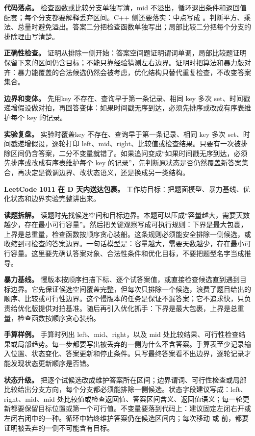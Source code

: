 \textbf{代码落点。} 检查函数或比较分支单独写清，mid 不溢出，循环退出条件和返回值配套；每个分支都要解释丢弃区间。C++ 侧还要落实：中点写成 。判断平方、乘法、总量时避免溢出。答案二分把检查函数单独写出；局部比较二分把每个分支的排除理由写清楚。

\textbf{正确性检查。} 证明从排除一侧开始：答案空间题证明谓词单调，局部比较题证明保留下来的区间仍含目标；不能只靠经验猜测左右边界。证明时把算法和暴力版对齐：暴力能覆盖的合法候选仍然会被考虑，优化结构只替代重复检查，不改变答案集合。

\textbf{边界和变体。} 先用key 不存在、查询早于第一条记录、相同 key 多次 set、时间戳递增假设做对拍，再回答变体：如果时间戳无序到达，必须先排序或改成有序表维护每个 key 的记录。

\textbf{实验复盘。} 实验时覆盖key 不存在、查询早于第一条记录、相同 key 多次 set、时间戳递增假设，逐轮打印 left、mid、right、比较值或检查结果。只要有一次被排除区间仍含答案，二分不变量就错了。如果追问变成“如果时间戳无序到达，必须先排序或改成有序表维护每个 key 的记录”，先判断原状态是否仍然覆盖新答案集合，再决定是微调边界、改状态语义，还是换成另一类结构。

\noindent\textbf{LeetCode 1011 在 D 天内送达包裹。} 工作坊目标：把题面模型、暴力基线、优化状态和边界实验完整讲出来。

\textbf{读题拆解。} 读题时先找候选空间和目标边界。本题可以压成“容量越大，需要天数越少，存在最小可行容量”。然后把关键观察写成可执行规则：下界是最大包裹，上界是总重量，检查函数按顺序贪心装船。这条规则必须能安全排除一侧候选，或收缩到可检查的答案边界。一句话模型是：容量越大，需要天数越少，存在最小可行容量。这里要先确认答案对象、合法性条件和优化目标，不要把题型名字当成推导。

\textbf{暴力基线。} 慢版本按顺序扫描下标、逐个试答案值，或直接检查候选直到遇到目标边界。它先保证候选空间覆盖完整，但每次只排除一个候选，浪费了题目给出的顺序、比较或可行性边界。这个慢版本的任务是保证不漏答案；它不追求快，只负责给优化版提供对拍基准。随后再引入优化抓手：下界是最大包裹，上界是总重量，检查函数按顺序贪心装船。

\textbf{手算样例。} 手算时列出 left、mid、right，以及 mid 处比较结果、可行性检查结果或局部趋势。每一步都要写出被丢弃的一侧为什么不含答案。手算表至少记录输入位置、状态变化、答案更新和停止条件。只写最终答案看不出边界，逐轮记录才能发现状态更新顺序是否错。

\textbf{状态升级。} 把逐个试候选改成维护答案所在区间；边界谓词、可行性检查或局部比较给出分支方向，每个分支都必须能排除一侧候选。状态字段建议写成：left、right、mid、mid 处比较值或检查返回值、答案区间含义、返回值语义；每一轮更新都要保留目标位置或第一个可行值。不变量要落到代码上：建议固定左闭右开或左闭右闭中的一种。循环中始终维护答案仍在候选区间内；每次移动  或  前，都要证明被丢弃的一侧不可能含有目标。

